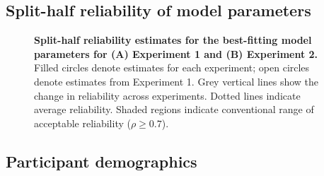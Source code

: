 \documentclass[a4paper,12pt]{article}
\begin{document}
\begin{refsection}[supp]
\clearpage
\subsection*{Split-half reliability of model parameters}

\begin{figure}[h]
    \centerline{}
    \caption{{\bf Split-half reliability estimates for the best-fitting model parameters for (A) Experiment 1 and (B) Experiment 2.} Filled circles denote estimates for each experiment; open circles denote estimates from Experiment 1. Grey vertical lines show the change in reliability across experiments. Dotted lines indicate average reliability. Shaded regions indicate conventional range of acceptable reliability ($\rho \geq 0.7$).}
    \label{fig:figS04}
\end{figure}

\clearpage
\subsection*{Participant demographics}


\end{refsection}
\end{document}
